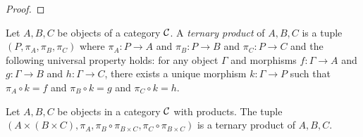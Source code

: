 \begin{proof}


\todo{}
\todo{}
\end{proof}

\begin{definition}
  Let \(A,B,C\) be objects of a category \(\mathcal C\).
  A \emph{ternary product} of \(A,B,C\)
  is a tuple \((P,\pi_A,\pi_B,\pi_C)\)
  where \(\pi_A : P\to A\) and \(\pi_B : P \to B\)
  and \(\pi_C : P \to C\)
  and the following universal property holds:
  for any object \(\Gamma\)
  and morphisms \(f : \Gamma \to A\)
  and \(g : \Gamma \to B\) and \(h : \Gamma \to C\),
  there exists a unique morphism \(k : \Gamma \to P\)
  such that \(\pi_A \circ k = f\)
  and \(\pi_B \circ k = g\) and \(\pi_C \circ k = h\).
\end{definition}

\begin{proposition}
  Let \(A,B,C\) be objects in a category \(\mathcal C\) with products.
  The tuple \((A\times (B\times C), \pi_A, \pi_B \circ \pi_{B\times C}, \pi_C \circ \pi_{B\times C})\)
  is a ternary product of \(A,B,C\).
\end{proposition}

